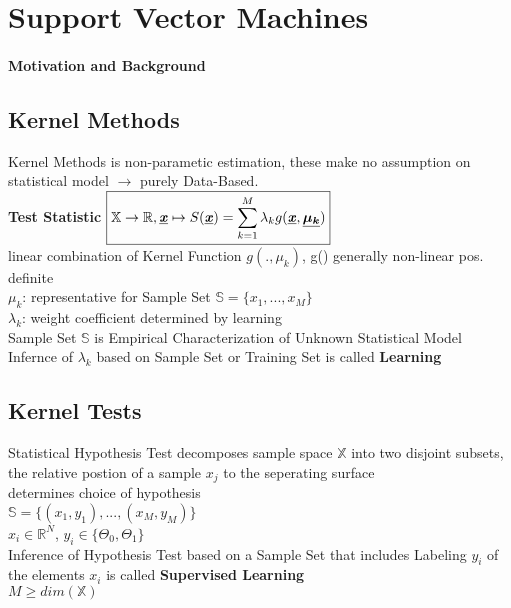 \section{Support Vector Machines}

	\paragraph{Motivation and Background}
\begin{sectionbox}

	\subsection{Kernel Methods} 
	Kernel Methods is non-parametic estimation, these make no assumption on statistical model $\rightarrow$ purely Data-Based. \\
	\textbf{Test Statistic} 
	$\boxed{\mathbb{X} \rightarrow \mathbb{R}, \underline{\textbf{\textit{x}}}\mapsto S(\underline{\textbf{\textit{x}}})= \sum_{k=1}^{M} \lambda_kg(\underline{\textbf{\textit{x}}}, \underline{\boldsymbol{\mu_k}})}$ \\
	linear combination of Kernel Function $g(.,\mu_k)$, g() generally non-linear pos. definite \\ %
	
	$\mu_k$: representative for Sample Set $\mathbb{S}=\{x_1,...,x_M\}$ \\  
	$\lambda_k$: weight coefficient determined by learning \\
	Sample Set $\mathbb{S}$ is Empirical Characterization of Unknown Statistical Model \\
	Infernce of $\lambda_k$ based on Sample Set or Training Set is called \textbf{Learning}

	

	\subsection{Kernel Tests}
Statistical Hypothesis Test decomposes sample space $\mathbb{X}$ into two disjoint subsets, the relative postion of a sample $x_j$ to the seperating surface \\determines choice of hypothesis\\
$\boxed{\mathbb{S} = \{(x_1, y_1),...,(x_M, y_M)\}}$ %
\\
$x_i \in \mathbb{R}^N$, $y_i \in \{\Theta_0, \Theta_1\}$ \\
Inference of Hypothesis Test based on a Sample Set that includes Labeling $y_i$ of the elements $x_i$ is called \textbf{Supervised Learning} \\
$M \geq dim(\mathbb{X})$

\end{sectionbox}
